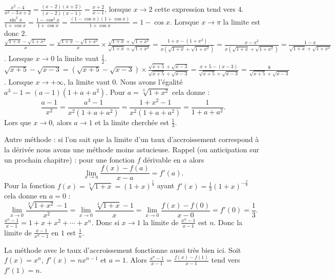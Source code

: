{{$\frac{x^2-4}{x^2-3\,x+2}=\frac{(x-2)(x+2)}{(x-2)(x-1)} = \frac{x+2}{x-1}$,
lorsque $x\to 2$ cette expression tend vers $4$.
$\frac{\sin^2 x}{1+\cos x} = \frac{1-\cos^2 x}{1+\cos x} = \frac{(1-\cos x)(1+\cos x)}{1+\cos x} = 1-\cos x$.
Lorsque $x\to \pi$ la limite est donc $2$.
$\frac{\sqrt{1+x}-\sqrt{1+x^2}}{x} = \frac{\sqrt{1+x}-\sqrt{1+x^2}}{x}\times\frac{\sqrt{1+x}+\sqrt{1+x^2}}{\sqrt{1+x}+\sqrt{1+x^2}}
= \frac{1+x - (1+x^2)}{x(\sqrt{1+x}+\sqrt{1+x^2})} = \frac{x - x^2}{x(\sqrt{1+x}+\sqrt{1+x^2})} = \frac{1-x}{\sqrt{1+x}+\sqrt{1+x^2}}$.
Lorsque $x\to 0$ la limite vaut $\frac 12$.
$\sqrt{x+5}-\sqrt{x-3} = \left( \sqrt{x+5}-\sqrt{x-3}\right) \times \frac{\sqrt{x+5}+\sqrt{x-3}}{\sqrt{x+5}+\sqrt{x-3}}
= \frac{x+5-(x-3)}{\sqrt{x+5}+\sqrt{x-3}} = \frac{8}{\sqrt{x+5}+\sqrt{x-3}}$. Lorsque $x \to +\infty$, la limite vaut $0$.
Nous avons l'égalité $a^3-1 = (a-1)(1+a+a^2)$. Pour $a = \sqrt[3]{1+x^2}$
cela donne :
$$\frac{a-1}{x^2} = \frac{a^3-1}{x^2(1+a+a^2)} = \frac{1+x^2-1}{x^2(1+a+a^2)} = \frac{1}{1+a+a^2}.$$
Lors que $x\to 0$, alors $a \to 1$ et la limite cherchée est $\frac 13$.

Autre méthode : si l'on sait que la limite d'un taux d'accroissement correspond à la dérivée nous avons une méthode moins
astucieuse. Rappel (ou anticipation sur un prochain chapitre) : pour une fonction $f$ dérivable en $a$ alors
$$\lim_{x\to a} \frac{f(x)-f(a)}{x-a} = f'(a).$$
Pour la fonction $f(x) = \sqrt[3]{1+x} =(1+x)^{\frac 13}$ ayant $f'(x) = \frac 13 (1+x)^{-\frac 23}$ cela donne en $a=0$ :
$$\lim_{x\to 0} \frac{\sqrt[3]{1+x^2} -1}{x^2} = \lim_{x\to 0} \frac{\sqrt[3]{1+x} -1}{x} = \lim_{x\to 0} \frac{f(x)-f(0)}{x-0} = f'(0) = \frac 13.$$
$\frac{x^n-1}{x-1} = 1+x+x^2+\cdots + x^n$. Donc si $x\to 1$ la limite de  $\frac{x^n-1}{x-1}$ est  $n$.
Donc la limite de $\frac{x-1}{x^n-1}$ en $1$ est $\frac 1n$.

La méthode avec le taux d'accroissement fonctionne aussi très bien ici. Soit $f(x) = x^n$, $f'(x)=nx^{n-1}$ et $a=1$.
Alors $\frac{x^n-1}{x-1} = \frac{f(x)-f(1)}{x-1}$ tend vers $f'(1)=n$.
}
}
